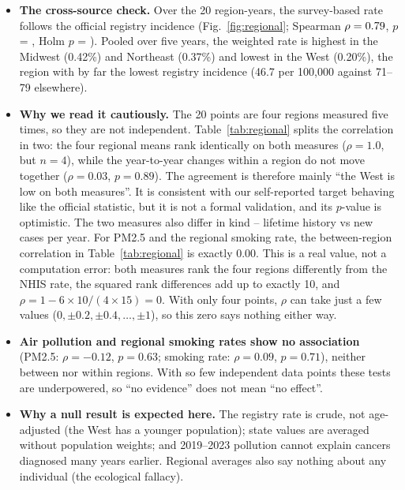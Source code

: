 \begin{itemize}
  \item \textbf{The cross-source check.} Over the 20 region-years, the survey-based rate follows the official registry incidence (Fig.~\ref{fig:regional}; Spearman $\rho = 0.79$, $p$ = \pRegistry, Holm $p$ = \holmRegistry). Pooled over five years, the weighted rate is highest in the Midwest (0.42\%) and Northeast (0.37\%) and lowest in the West (0.20\%), the region with by far the lowest registry incidence (46.7 per 100,000 against 71--79 elsewhere).
  \item \textbf{Why we read it cautiously.} The 20 points are four regions measured five times, so they are not independent. Table~\ref{tab:regional} splits the correlation in two: the four regional means rank identically on both measures ($\rho = 1.0$, but $n = 4$), while the year-to-year changes within a region do not move together ($\rho = 0.03$, $p = 0.89$). The agreement is therefore mainly ``the West is low on both measures''. It is consistent with our self-reported target behaving like the official statistic, but it is not a formal validation, and its $p$-value is optimistic. The two measures also differ in kind -- lifetime history vs new cases per year. For PM2.5 and the regional smoking rate, the between-region correlation in Table~\ref{tab:regional} is exactly 0.00. This is a real value, not a computation error: both measures rank the four regions differently from the NHIS rate, the squared rank differences add up to exactly 10, and $\rho = 1 - 6 \times 10 / (4 \times 15) = 0$. With only four points, $\rho$ can take just a few values ($0, \pm 0.2, \pm 0.4, \ldots, \pm 1$), so this zero says nothing either way.
  \item \textbf{Air pollution and regional smoking rates show no association} (PM2.5: $\rho = -0.12$, $p = 0.63$; smoking rate: $\rho = 0.09$, $p = 0.71$), neither between nor within regions. With so few independent data points these tests are underpowered, so ``no evidence'' does not mean ``no effect''.
  \item \textbf{Why a null result is expected here.} The registry rate is crude, not age-adjusted (the West has a younger population); state values are averaged without population weights; and 2019--2023 pollution cannot explain cancers diagnosed many years earlier. Regional averages also say nothing about any individual (the ecological fallacy).

\end{itemize}
